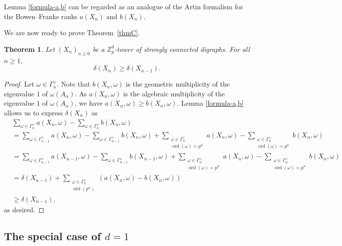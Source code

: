\documentclass[11pt]{amsart}
\DeclareMathOperator{\ord}{ord}
\newtheorem{theorem}{Theorem}[section]
\numberwithin{equation}{section}
\theoremstyle{remark}
\newcommand{\?}{\stackrel{?}{=}}
\newcommand{\Z}{\mathbb{Z}}
\begin{document}
 Lemma \ref{formula-a,b} can be regarded as an analogue of the Artin formalism for the Bowen--Franks ranks $a(X_n)$ and $b(X_n)$. 

We are now ready to prove Theorem~\ref{thmC}. 
\begin{theorem}
\label{thm.growth-delta}
    Let $(X_n)_{n\ge0}$ be a $\Z_p^d$-tower of strongly connected digraphs. For all $n\ge1$,
    \[\delta(X_n)\ge \delta(X_{n-1}).\]
\end{theorem}

\begin{proof}
    Let $\omega \in{\Gamma_n^\vee}$. Note that  $b(X_n,\omega)$ is the geometric multiplicity of the eigenvalue $1$ of $\omega(A_\alpha)$. As $a(X_n,\omega)$ is the algebraic multiplicity of the eigenvalue $1$ of $\omega(A_\alpha)$, we have $a(X_n,\omega)\ge b(X_n,\omega)$.  
    Lemma \ref{formula-a,b} allows us to express $\delta(X_n)$ as
    \begin{align*}&\sum_{\omega\in \Gamma_n^\vee}a(X_n,\omega)-\sum_{\omega\in \Gamma_n^\vee}b(X_n,\omega)\\
    &=\sum_{\omega \in \Gamma_{n-1}^\vee}a(X_{n},\omega)-\sum_{\omega\in \Gamma_{n-1}^\vee}b(X_n,\omega)+\sum_{\substack{\omega\in \Gamma_n^\vee\\\ord(\omega)=p^n}}a(X_{n},\omega)-\sum_{\substack{\omega\in \Gamma_n^\vee\\\ord(\omega)=p^n}}b(X_n,\omega)\\
    &=\sum_{\omega \in \Gamma_{n-1}^\vee}a(X_{n-1},\omega)-\sum_{\omega\in \Gamma_{n-1}^\vee}b(X_{n-1},\omega)+\sum_{\substack{\omega\in \Gamma_n^\vee\\\ord(\omega)=p^n}}a(X_{n},\omega)-\sum_{\substack{\omega\in \Gamma_n^\vee\\\ord(\omega)=p^n}}b(X_n,\omega)\\
    &=\delta(X_{n-1})+\sum_{\substack{\omega\in \Gamma_n^\vee\\\ord(p^n)}}\left(a(X_n,\omega)-b(X_n,\omega)\right)\\
    &\ge \delta(X_{n-1}), \end{align*}
as desired.
\end{proof}

\subsection{The special case of $d=1$}
\end{document}
